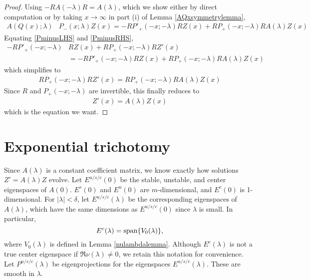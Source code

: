 \documentclass[thesis.tex]{subfiles}
\begin{document}
\begin{lemma}
\begin{proof}
Using $-R A(-\lambda) R = A(\lambda)$, which we show either by direct computation or by taking $x \rightarrow \infty$ in part (i) of Lemma \ref{AQxsymmetrylemma},
\begin{align}\label{PminusRHS}
A(Q(x); \lambda)&P_-(x; \lambda) Z(x) =  -R P'_+(-x; -\lambda) R Z(x) + R P_+(-x; -\lambda) R A(\lambda) Z(x)
\end{align}
Equating \cref{PminusLHS} and \cref{PminusRHS},
\begin{align*}
-RP'_+(-x; -\lambda)&R Z(x) + RP_+(-x; -\lambda)R Z'(x) \\
&= -R P'_+(-x; -\lambda) R Z(x) + R P_+(-x; -\lambda) R A(\lambda) Z(x)
\end{align*}
which simplifies to
\begin{align*}
RP_+(-x; -\lambda)R Z'(x) = R P_+(-x; -\lambda) R A(\lambda) Z(x)
\end{align*}
Since $R$ and $P_+(-x; -\lambda)$ are invertible, this finally reduces to 
\begin{align*}
Z'(x) = A(\lambda) Z(x)
\end{align*}
which is the equation we want.
\end{proof}
\end{lemma}

\section{Exponential trichotomy}

Since $A(\lambda)$ is a constant coefficient matrix, we know exactly how solutions $Z' = A(\lambda)Z$ evolve. Let $E^{u/s/c}(0)$ be the stable, unstable, and center eigenspaces of $A(0)$. $E^s(0)$ and $E^u(0)$ are $m$-dimensional, and $E^c(0)$ is 1-dimensional. For $|\lambda| < \delta$, let $E^{u/s/c}(\lambda)$ be the corresponding eigenspaces of $A(\lambda)$, which have the same dimensions as $E^{u/s/c}(0)$ since $\lambda$ is small. In particular, 
\[
E^c(\lambda) = \operatorname{span}\{ V_0(\lambda) \},
\]
where $V_0(\lambda)$ is defined in Lemma \ref{nulambdalemma}. Although $E^c(\lambda)$ is not a true center eigenspace if $\Re \nu(\lambda) \neq 0$, we retain this notation for convenience. Let $P^{u/s/c}(\lambda)$ be eigenprojections for the eigenspaces $E^{u/s/c}(\lambda)$. These are smooth in $\lambda$. 
\end{document}

